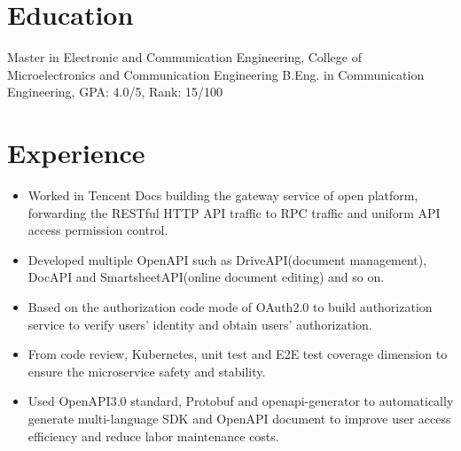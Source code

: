 \documentclass{resume}
\begin{document}



\section{Education}
Master in Electronic and Communication Engineering, College of Microelectronics and Communication Engineering
B.Eng. in Communication Engineering, GPA: 4.0/5, Rank: 15/100

\section{Experience}
\begin{itemize}
    \item Worked in Tencent Docs building the gateway service of open platform, forwarding the RESTful HTTP API traffic to RPC traffic and uniform API access permission control.
    \item Developed multiple OpenAPI such as DriveAPI(document management), DocAPI and SmartsheetAPI(online document editing) and so on.
    \item Based on the authorization code mode of OAuth2.0 to build authorization service to verify users' identity and obtain users' authorization. 
    \item From code review, Kubernetes, unit test and E2E test coverage dimension to ensure the microservice safety and stability.
    \item Used OpenAPI3.0 standard, Protobuf and openapi-generator to automatically generate multi-language SDK and OpenAPI document to improve user access efficiency and reduce labor maintenance costs.
\end{itemize}
\end{document}
